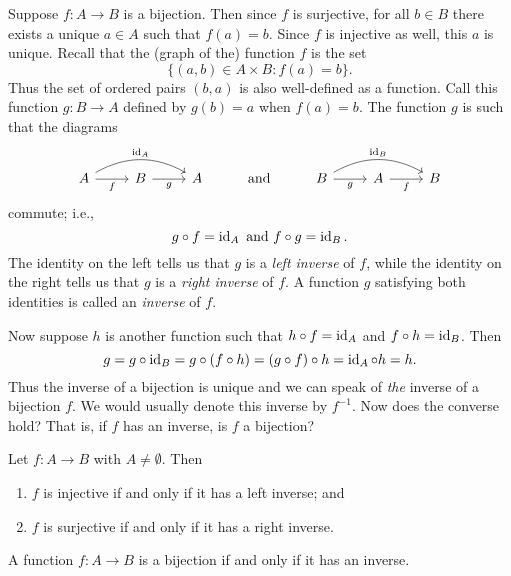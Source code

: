\begin{sectionthm}
    Suppose \(f : A \to B\) is a bijection. Then since \(f\) is surjective, for
    all \(b \in B\) there exists a unique \(a \in A\) such that \(f(a) = b\).
    Since \(f\) is injective as well, this \(a\) is unique. Recall that the
    (graph of the) function \(f\) is the set
    \[
        \{(a, b) \in A \times B : f(a) = b\}.
    \]
    Thus the set of ordered pairs \((b, a)\) is also well-defined as a function.
    Call this function \(g : B \to A\) defined by \(g(b) = a\) when \(f(a) =
    b\). The function \(g\) is such that the diagrams
    \[
        \begin{tikzcd}
            A \arrow[r, "f"'] \arrow[rr, "\id_A", bend left] & B \arrow[r, "g"'] & A & \text{and}& B \arrow[r, "g"'] \arrow[rr, "\id_B", bend left] & A \arrow[r, "f"'] & B
        \end{tikzcd}
    \]
    commute; i.e.,
    \[
        g \circ f = \operatorname{id}_A \text{ and } f \circ g = \operatorname{id}_B.
    \]
    The identity on the left tells us that \(g\) is a \emph{left inverse} of
    \(f\), while the identity on the right tells us that \(g\) is a \emph{right
    inverse} of \(f\). A function \(g\) satisfying both identities is called an
    \emph{inverse} of \(f\).

    Now suppose \(h\) is another function such that \(h \circ f = \operatorname{id}_A\) and
    \(f \circ h = \operatorname{id}_B\). Then
    \[
        g = g \circ \operatorname{id}_B = g \circ (f \circ h) = (g \circ f) \circ h = \operatorname{id}_A \circ h = h.
    \]
    Thus the inverse of a bijection is unique and we can speak of \emph{the}
    inverse of a bijection \(f\). We would usually denote this inverse by
    \(f^{-1}\). Now does the converse hold? That is, if \(f\) has an inverse, is
    \(f\) a bijection?
\end{sectionthm}

\begin{theorem}
    Let \(f: A \to B\) with \(A \neq \emptyset\). Then
    \begin{enumerate}[label=(\alph*)]
        \item \(f\) is injective if and only if it has a left inverse; and
        \item \(f\) is surjective if and only if it has a right inverse.
    \end{enumerate}
\end{theorem}

\begin{corollary}
    A function \(f: A \to B\) is a bijection if and only if it has an inverse.
\end{corollary}

